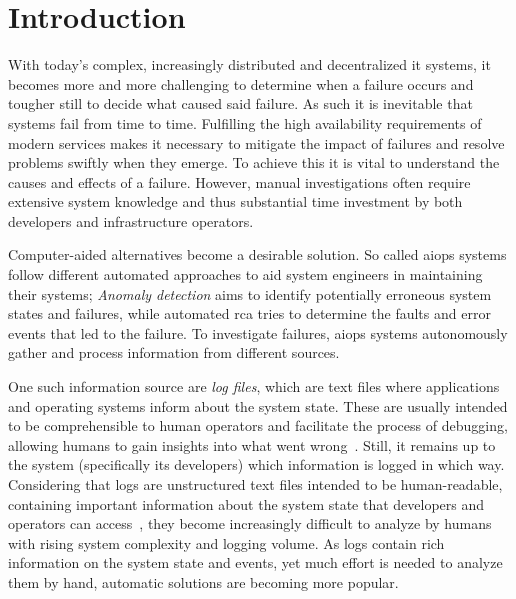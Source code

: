 \chapter{Introduction}\label{ch:introduction}

\acresetall


With today's complex, increasingly distributed and decentralized \ac{it} systems,
it becomes more and more challenging to determine when a failure occurs
and tougher still to decide what caused said failure.
As such it is inevitable that systems fail from time to time.
Fulfilling the high availability requirements of modern services
makes it necessary to mitigate the impact of failures and resolve problems swiftly when they emerge.
To achieve this it is vital to understand the causes and effects of a failure.
However, manual investigations often require extensive system knowledge
and thus substantial time investment by
both developers and infrastructure operators.

Computer-aided alternatives become a desirable solution.
So called \ac{aiops} systems follow different automated approaches to aid system engineers
in maintaining their systems;
\emph{Anomaly detection} aims to identify potentially erroneous system states and failures,
while automated \ac{rca} tries to determine the faults and error events that led to the failure.
To investigate failures, \ac{aiops} systems autonomously gather and process information from different sources.

One such information source are \emph{log files},
which are text files where applications and operating systems inform about the system state.
These are usually intended to be comprehensible to human operators
and facilitate the process of debugging,
allowing humans to gain insights into what went wrong~\parencite{log_analysis}.
Still, it remains up to the system (specifically its developers) which information is logged in which way.
Considering that logs are unstructured text files intended to be human-readable,
containing important information about the system state that developers and operators can access~\parencite{log_analysis},
they become increasingly difficult to analyze by humans with rising system complexity and logging volume.
As logs contain rich information on the system state and events,
yet much effort is needed to analyze them by hand, automatic solutions are becoming more popular.

